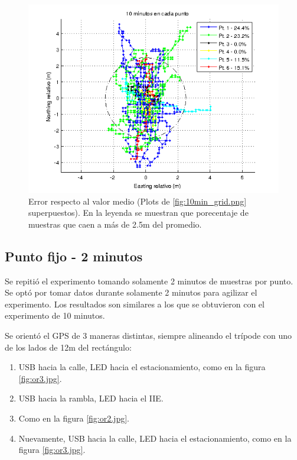 \documentclass[spanish,12pt,a4paper,titlepage]{report}
\begin{document}
\begin{figure}[h!]
  \includegraphics[width=1.1\textwidth]{./img/10m_todos.png}
  \caption{Error respecto al valor medio (Plots de \ref{fig:10min_grid.png} superpuestos). En la leyenda se muestran que porecentaje de muestras que caen a más de 2.5m del promedio.}
  \label{fig:10m_todos.png}
\end{figure}

\newpage
\subsection{Punto fijo - 2 minutos}

Se repitió el experimento tomando solamente 2 minutos de muestras por punto. Se optó por tomar datos durante solamente 2 minutos para agilizar el experimento. Los resultados son similares a los que se obtuvieron con el experimento de 10 minutos.

Se orientó el GPS de 3 maneras distintas, siempre alineando el trípode con uno de los lados de 12m del rectángulo:

\begin{enumerate}
\item USB hacia la calle, LED hacia el estacionamiento, como en la figura \ref{fig:or3.jpg}.
\item USB hacia la rambla, LED hacia el IIE.
\item Como en la figura \ref{fig:or2.jpg}.
\item Nuevamente, USB hacia la calle, LED hacia el estacionamiento, como en la figura \ref{fig:or3.jpg}.
\end{enumerate}
\end{document}
